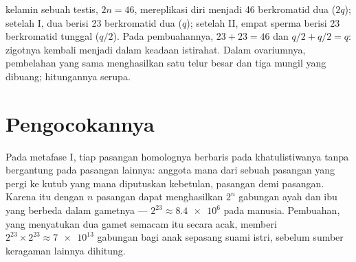 \begin{example}\label{ex:g12:meiosis-genetic-shuffling:numbers}
 kelamin sebuah testis, $2n = 46$, mereplikasi diri menjadi 46
 berkromatid dua ($2q$); setelah  I, dua  berisi 23
 berkromatid dua ($q$); setelah  II, empat  sperma
berisi 23  berkromatid tunggal ($q/2$). Pada pembuahannya, $23 + 23 =
46$ dan $q/2 + q/2 = q$: zigotnya kembali menjadi 
 dalam keadaan istirahat. Dalam ovariumnya, pembelahan yang sama
menghasilkan satu  telur besar dan tiga  mungil yang dibuang;
hitungannya serupa.
\end{example}

\section{Pengocokannya}

\begin{proposition}\label{prop:g12:meiosis-genetic-shuffling:assortment}
Pada metafase I, tiap pasangan homolognya berbaris pada khatulistiwanya
tanpa bergantung pada pasangan lainnya: anggota mana dari sebuah
pasangan yang pergi ke kutub yang mana diputuskan kebetulan, pasangan
demi pasangan. Karena itu  dengan $n$ pasangan dapat menghasilkan
$2^n$ gabungan  ayah dan ibu yang berbeda dalam gametnya ---
$2^{23} \approx \num{8.4e6}$ pada manusia. Pembuahan, yang menyatukan
dua gamet semacam itu secara acak, memberi $2^{23}
\times 2^{23} \approx \num{7e13}$ gabungan  bagi anak sepasang suami istri,
sebelum sumber keragaman lainnya dihitung.
\end{proposition}
\admitted


